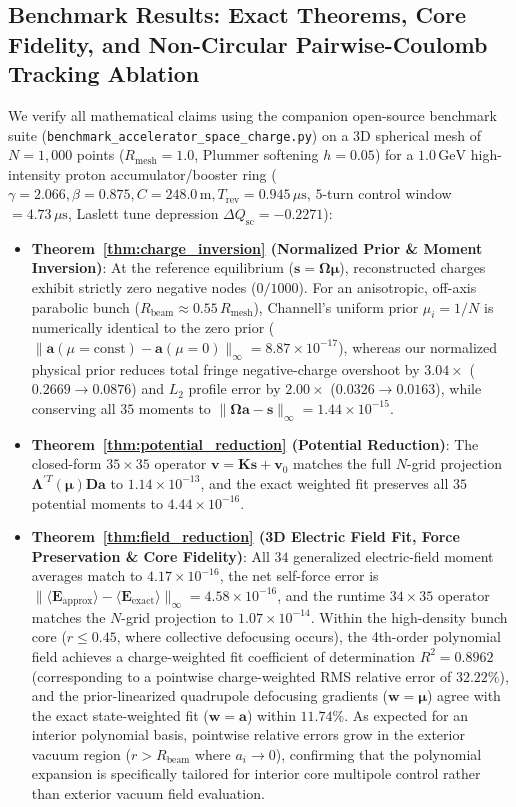 \documentclass[11pt,a4paper]{article}
\newcommand{\bOmega}{\mathbf{\Omega}}
\newcommand{\bLambda}{\mathbf{\Lambda}}
\begin{document}
\subsection{Benchmark Results: Exact Theorems, Core Fidelity, and Non-Circular Pairwise-Coulomb Tracking Ablation}
We verify all mathematical claims using the companion open-source benchmark suite (\texttt{benchmark\_\allowbreak accelerator\_\allowbreak space\_\allowbreak charge.py}) on a 3D spherical mesh of $N = 1,000$ points ($R_{\mathrm{mesh}} = 1.0$, Plummer softening $h = 0.05$) for a $1.0\,\mathrm{GeV}$ high-intensity proton accumulator/booster ring ($\gamma = 2.066, \beta = 0.875, C = 248.0\,\mathrm{m}, T_{\mathrm{rev}} = 0.945\,\mu\mathrm{s}$, $5$-turn control window $= 4.73\,\mu\mathrm{s}$, Laslett tune depression $\Delta Q_{\mathrm{sc}} = -0.2271$):
\begin{itemize}
    \item \textbf{Theorem~\ref{thm:charge_inversion} (Normalized Prior \& Moment Inversion)}: At the reference equilibrium ($\bm{s} = \bOmega\bm{\mu}$), reconstructed charges exhibit strictly zero negative nodes ($0/1000$). For an anisotropic, off-axis parabolic bunch ($R_{\mathrm{beam}} \approx 0.55\,R_{\mathrm{mesh}}$), Channell's uniform prior $\mu_i = 1/N$ is numerically identical to the zero prior ($\|\bm{a}(\mu=\mathrm{const}) - \bm{a}(\mu=0)\|_\infty = 8.87 \times 10^{-17}$), whereas our normalized physical prior reduces total fringe negative-charge overshoot by $3.04\times$ ($0.2669 \to 0.0876$) and $L_2$ profile error by $2.00\times$ ($0.0326 \to 0.0163$), while conserving all $35$ moments to $\|\bOmega\bm{a} - \bm{s}\|_\infty = 1.44 \times 10^{-15}$.
    \item \textbf{Theorem~\ref{thm:potential_reduction} (Potential Reduction)}: The closed-form $35 \times 35$ operator $\bm{v} = \bm{K}\bm{s} + \bm{v}_0$ matches the full $N$-grid projection $\bLambda^{\prime T}(\bm{\mu})\bm{D}\bm{a}$ to $1.14 \times 10^{-13}$, and the exact weighted fit preserves all $35$ potential moments to $4.44 \times 10^{-16}$.
    \item \textbf{Theorem~\ref{thm:field_reduction} (3D Electric Field Fit, Force Preservation \& Core Fidelity)}: All $34$ generalized electric-field moment averages match to $4.17 \times 10^{-16}$, the net self-force error is $\|\langle \bm{E}_{\mathrm{approx}}\rangle - \langle \bm{E}_{\mathrm{exact}}\rangle\|_\infty = 4.58 \times 10^{-16}$, and the runtime $34 \times 35$ operator matches the $N$-grid projection to $1.07 \times 10^{-14}$. Within the high-density bunch core ($r \le 0.45$, where collective defocusing occurs), the 4th-order polynomial field achieves a charge-weighted fit coefficient of determination $R^2 = 0.8962$ (corresponding to a pointwise charge-weighted RMS relative error of $32.22\%$), and the prior-linearized quadrupole defocusing gradients ($\bm{w}=\bm{\mu}$) agree with the exact state-weighted fit ($\bm{w}=\bm{a}$) within $11.74\%$. As expected for an interior polynomial basis, pointwise relative errors grow in the exterior vacuum region ($r > R_{\mathrm{beam}}$ where $a_i \to 0$), confirming that the polynomial expansion is specifically tailored for interior core multipole control rather than exterior vacuum field evaluation.
\end{itemize}
\end{document}
